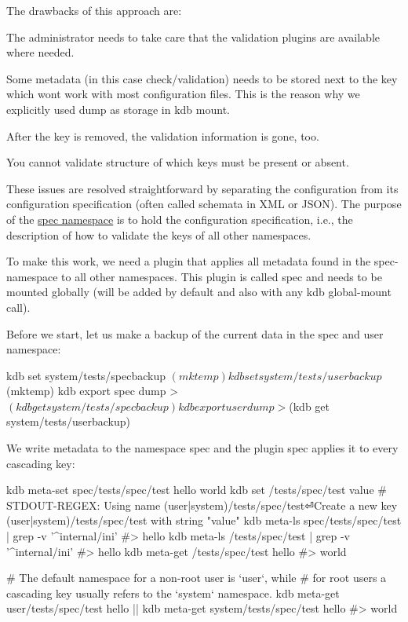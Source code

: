 The drawbacks of this approach are\+:


\begin{DoxyItemize}
\item The administrator needs to take care that the validation plugins are available where needed.
\item Some metadata (in this case {\ttfamily check/validation}) needs to be stored next to the key which won\textquotesingle{}t work with most configuration files. This is the reason why we explicitly used {\ttfamily dump} as storage in {\ttfamily kdb mount}.
\item After the key is removed, the validation information is gone, too.
\item You cannot validate structure of which keys must be present or absent.
\end{DoxyItemize}

These issues are resolved straightforward by separating the configuration from its configuration specification (often called schemata in X\+ML or J\+S\+ON). The purpose of the \hyperlink{doc_tutorials_namespaces_md}{spec namespace} is to hold the configuration specification, i.\+e., the description of how to validate the keys of all other namespaces.

To make this work, we need a plugin that applies all metadata found in the {\ttfamily spec}-\/namespace to all other namespaces. This plugin is called {\ttfamily spec} and needs to be mounted globally (will be added by default and also with any {\ttfamily kdb global-\/mount} call).

Before we start, let us make a backup of the current data in the spec and user namespace\+:


\begin{DoxyCode}
kdb set system/tests/specbackup $(mktemp)
kdb set system/tests/userbackup $(mktemp)
kdb export spec dump > $(kdb get system/tests/specbackup)
kdb export user dump > $(kdb get system/tests/userbackup)
\end{DoxyCode}


We write metadata to the namespace {\ttfamily spec} and the plugin {\ttfamily spec} applies it to every cascading key\+:


\begin{DoxyCode}
kdb meta-set spec/tests/spec/test hello world
kdb set /tests/spec/test value
# STDOUT-REGEX: Using name (user|system)/tests/spec/test⏎Create a new key (user|system)/tests/spec/test
       with string "value"
kdb meta-ls spec/tests/spec/test | grep -v '^internal/ini'
#> hello
kdb meta-ls /tests/spec/test | grep -v '^internal/ini'
#> hello
kdb meta-get /tests/spec/test hello
#> world

# The default namespace for a non-root user is `user`, while
# for root users a cascading key usually refers to the `system` namespace.
kdb meta-get user/tests/spec/test hello || kdb meta-get system/tests/spec/test hello
#> world
\end{DoxyCode}


